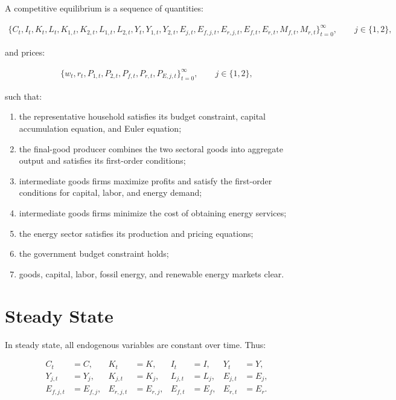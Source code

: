 \documentclass[12pt]{article}
\begin{document}
A competitive equilibrium is a sequence of quantities:

\begin{align}
\{
C_t,I_t,K_t,L_t,K_{1,t},K_{2,t},L_{1,t},L_{2,t},
Y_t,Y_{1,t},Y_{2,t},
E_{j,t},E_{f,j,t},E_{r,j,t},
E_{f,t},E_{r,t},M_{f,t},M_{r,t}
\}_{t=0}^{\infty},
\qquad
j \in \{1,2\},
\end{align}

and prices:

\begin{align}
\{
w_t,r_t,P_{1,t},P_{2,t},P_{f,t},P_{r,t},P_{E,j,t}
\}_{t=0}^{\infty},
\qquad
j \in \{1,2\},
\end{align}

such that:

\begin{enumerate}
    \item the representative household satisfies its budget constraint, capital accumulation equation, and Euler equation;
    \item the final-good producer combines the two sectoral goods into aggregate output and satisfies its first-order conditions;
    \item intermediate goods firms maximize profits and satisfy the first-order conditions for capital, labor, and energy demand;
    \item intermediate goods firms minimize the cost of obtaining energy services;
    \item the energy sector satisfies its production and pricing equations;
    \item the government budget constraint holds;
    \item goods, capital, labor, fossil energy, and renewable energy markets clear.
\end{enumerate}

\section{Steady State}

In steady state, all endogenous variables are constant over time. Thus:

\begin{align}
C_t &= C,
&
K_t &= K,
&
I_t &= I,
&
Y_t &= Y,
\\
Y_{j,t} &= Y_j,
&
K_{j,t} &= K_j,
&
L_{j,t} &= L_j,
&
E_{j,t} &= E_j,
\\
E_{f,j,t} &= E_{f,j},
&
E_{r,j,t} &= E_{r,j},
&
E_{f,t} &= E_f,
&
E_{r,t} &= E_r.
\end{align}
\end{document}

